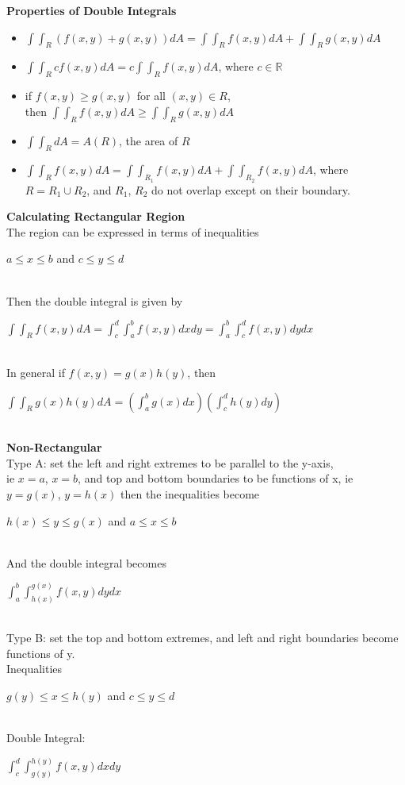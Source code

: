 \documentclass[10pt, a4paper]{article}
\begin{document}
\begin{multicols*}{3}
   \textbf{Properties of Double Integrals}
   \begin{itemize}
   	\setlength\itemsep{0em}
   	\item $\int\int_R (f(x, y) + g(x, y)) dA = \int \int_R f(x, y) dA + \int \int_R g(x, y) dA$
   	\item $ \int \int_R cf(x, y) dA = c \int \int_R f(x, y) dA$, where $c \in \mathbb{R}$
   	\item if $f(x, y) \geq g(x, y)$ for all $(x, y) \in R$, \\then $\int \int_R f(x, y) dA \geq \int \int_R g(x, y) dA$
   	\item $\int \int_R dA = A(R)$, the area of $R$
   	\item $\int \int_R f(x, y) dA = \int \int_{R_1} f(x, y) dA + \int \int_{R_2} f(x, y) dA$, where $R = R_1 \cup R_2$, and $R_1$, $R_2$ do not overlap except on their boundary.
   \end{itemize}

   \textbf{Calculating Rectangular Region}\\
   The region can be expressed in terms of inequalities\\
   \centerline{$a \leq x \leq b$ and $c \leq y \leq d$}\\
   Then the double integral is given by\\
   \centerline{$\int \int_R f(x, y) dA = \int_c^d\int_a^b f(x, y) dxdy = \int_a^b\int_c^d f(x, y) dydx$}\\
   
   In general if $f(x, y) = g(x)h(y)$, then\\
   \centerline{$\int\int_Rg(x)h(y) dA = \left(\int_a^b g(x) dx \right)\left(\int_c^d h(y) dy \right)$}\\
   
   \textbf{Non-Rectangular}\\
   	Type A: set the left and right extremes to be parallel to the y-axis,\\ ie $x = a$, $x = b$, and top and bottom boundaries to be functions of x, ie $y = g(x)$, $y = h(x)$ then the inequalities become\\
   	\centerline{$h(x) \leq y \leq g(x)$ and $a \leq x \leq b$}\\
   	And the double integral becomes \\
   	\centerline{$\int_a^b \int_{h(x)}^{g(x)} f(x, y) dydx$}\\
   	
   	Type B: set the top and bottom extremes, and left and right boundaries become functions of y.\\
   	Inequalities\\
   	\centerline{$g(y) \leq x \leq h(y)$ and $c \leq y \leq d$}\\
   	Double Integral:\\
   	\centerline{$\int_c^d\int_{g(y)}^{h(y)} f(x, y) dxdy$}\\
   	

\end{multicols*}
\end{document}
